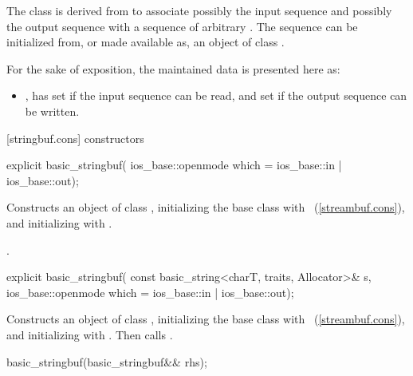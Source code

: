 \pnum
The class
is derived from
to associate possibly the input sequence and possibly
the output sequence with a sequence of arbitrary
.
The sequence can be initialized from, or made available as, an object of class
.

\pnum
For the sake of exposition, the maintained data is presented here as:
\begin{itemize}
\item
{},
has
set if the input sequence can be read, and
set if the output sequence can be written.
\end{itemize}

[stringbuf.cons]{  constructors}

%
\begin{itemdecl}
explicit basic_stringbuf(
  ios_base::openmode which = ios_base::in | ios_base::out);
\end{itemdecl}

\begin{itemdescr}
\pnum
\effects
Constructs an object of class
,
initializing the base class with
~(\ref{streambuf.cons}), and initializing
with .

\pnum
\postconditions
{}.
\end{itemdescr}

%
\begin{itemdecl}
explicit basic_stringbuf(
  const basic_string<charT, traits, Allocator>& s,
  ios_base::openmode which = ios_base::in | ios_base::out);
\end{itemdecl}

\begin{itemdescr}
\pnum
\effects
Constructs an object of class
,
initializing the base class with
~(\ref{streambuf.cons}), and initializing
with .
Then calls .
\end{itemdescr}

%
\begin{itemdecl}
basic_stringbuf(basic_stringbuf&& rhs);
\end{itemdecl}

